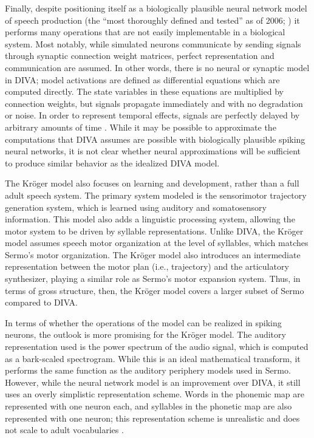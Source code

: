Finally, despite positioning itself as
a biologically plausible neural network model
of speech production
(the ``most thoroughly defined and tested''
as of 2006; \cite{guenther2006a})
it performs many operations
that are not easily implementable
in a biological system.
Most notably,
while simulated neurons communicate
by sending signals through
synaptic connection weight matrices,
perfect representation and communication
are assumed.
In other words, there is no neural
or synaptic model in DIVA;
model activations are defined as
differential equations
which are computed directly.
The state variables in these equations
are multiplied by connection weights,
but signals propagate immediately
and with no degradation or noise.
In order to represent temporal effects,
signals are perfectly delayed
by arbitrary amounts of time
\cite{nieto-castanon2011}.
While it may be possible to approximate
the computations that
DIVA assumes are possible
with biologically plausible spiking neural networks,
it is not clear whether
neural approximations will
be sufficient to produce similar behavior
as the idealized DIVA model.

The Kr\"{o}ger model also
focuses on learning and development,
rather than a full adult speech system.
The primary system modeled
is the sensorimotor trajectory generation system,
which is learned using
auditory and somatosensory information.
This model also adds
a linguistic processing system,
allowing the motor system to be driven
by syllable representations.
Unlike DIVA, the Kr\"{o}ger model
assumes speech motor organization
at the level of syllables,
which matches Sermo's motor organization.
The Kr\"{o}ger model also
introduces an intermediate representation
between the motor plan (i.e., trajectory)
and the articulatory synthesizer,
playing a similar role as Sermo's
motor expansion system.
Thus, in terms of gross structure, then,
the Kr\"{o}ger model covers a larger subset
of Sermo compared to DIVA.


In terms of whether the operations
of the model can be realized in spiking neurons,
the outlook is more promising
for the Kr\"{o}ger model.
The auditory representation used
is the power spectrum of the audio signal,
which is computed as a bark-scaled spectrogram.
While this is an ideal mathematical transform,
it performs the same function as the
auditory periphery models used in Sermo.
However, while the neural network model
is an improvement over DIVA,
it still uses an overly simplistic
representation scheme.
Words in the phonemic map
are represented with one neuron each,
and syllables in the phonetic map
are also represented with one neuron;
this representation scheme is unrealistic
and  does not scale to adult vocabularies
\cite{crawford2014}.

